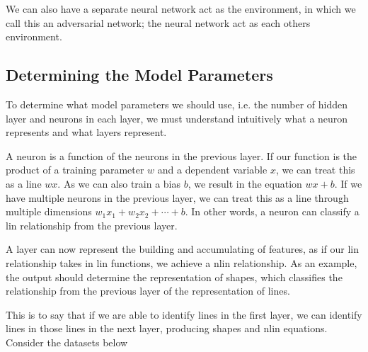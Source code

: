 We can also have a separate neural network act as the environment, in which we call this an adversarial network; the neural network act as each others environment.

\subsection{Determining the Model Parameters}

To determine what \gls{model} parameters we should use, i.e. the number of \gls{hidden} \gls{layer} and \gls{neuron}s in each \gls{layer}, we must understand intuitively what a \gls{neuron} represents and what \gls{layer}s represent.

A \gls{neuron} is a function of the \gls{neuron}s in the previous \gls{layer}. If our function is the product of a training parameter $w$ and a dependent variable $x$, we can treat this as a line $wx$. As we can also train a bias $b$, we result in the equation $wx+b$. If we have multiple \gls{neuron}s in the previous \gls{layer}, we can treat this as a line through multiple dimensions $w_1x_1+w_2x_2+\cdots+b$. In other words, a \gls{neuron} can classify a \gls{lin} relationship from the previous \gls{layer}.

A \gls{layer} can now represent the building and accumulating of features, as if our \gls{lin} relationship takes in \gls{lin} functions, we achieve a \gls{nlin} relationship. As an example, the output should determine the representation of shapes, which classifies the relationship from the previous \gls{layer} of the representation of lines. 

This is to say that if we are able to identify lines in the first \gls{layer}, we can identify lines in those lines in the next \gls{layer}, producing shapes and \gls{nlin} equations. Consider the datasets below




\hskip 5pt

